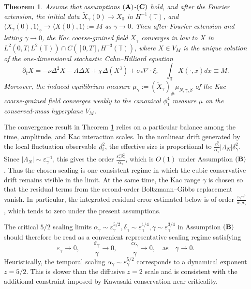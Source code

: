 \documentclass{article}
\newtheorem{theorem}{Theorem}
\begin{document}
\begin{theorem}\label{thm:main-informal}
Assume that assumptions \(({\bf A})\)-\(({\bf C})\) hold, and after the Fourier extension, the initial data $\widetilde X_\gamma(0)\longrightarrow X_0$ in $H^{-1}(\mathbb T)$, 
and
\(
    \langle X_\gamma(0),1\rangle_\gamma \to \langle X(0),1\rangle := M
\)
as $\gamma \to 0$.
Then after Fourier extension and letting \(\gamma\to0\), the Kac coarse-grained field $X_{\gamma}$ converges in law to $X$ in $L^2(0,T;L^2(\mathbb T))\cap C([0,T],H^{-3}(\mathbb T))$, where $X \in V_M$ is the unique solution of the one-dimensional stochastic Cahn–Hilliard equation
\begin{equation}\label{eq:modelB-intro}
    \partial_t X = -\nu \Delta^2 X - A \Delta X + \chi \Delta(X^3) + \sigma_* \nabla \cdot\xi, \quad \int_{\mathbb T} X(\cdot,x)dx \equiv M.
\end{equation}
Moreover, the induced equilibrium measure $\mu_\gamma := (\widetilde X_\gamma)_\#\mu_{N,\gamma,\beta}$ of the Kac coarse-grained field converges weakly to the canonical \(\phi^4_1\) measure \(\mu\) on the conserved-mass hyperplane \( V_M \).
\end{theorem}






The convergence result in Theorem \ref{thm:main-informal} relies on a particular balance among the time, amplitude, and Kac interaction scales.
In the nonlinear drift generated by the local fluctuation observable \(d_i^2\), the effective size is proportional to \(\frac{\varepsilon_\gamma^3}{\alpha_\gamma}|\Lambda_N|\delta_\gamma^2\). Since \(|\Lambda_N|\sim\varepsilon_\gamma^{-1}\), this gives the order \(\frac{\varepsilon_\gamma^2\delta_\gamma^2}{\alpha_\gamma}\), which is \(O(1)\) under Assumption \(({\bf B})\).
Thus the chosen scaling is one consistent regime in which the cubic conservative drift remains visible in the limit.
At the same time, the Kac range \(\gamma\) is chosen so that the residual terms from the second-order Boltzmann--Gibbs replacement vanish. In particular, the integrated residual error estimated below is of order
\(\frac{\varepsilon_\gamma\gamma^3}{\alpha_\gamma\delta_\gamma}\), which tends to zero under the present assumptions.


The critical \(5/2\) scaling limits \( \alpha_\gamma \sim \varepsilon_\gamma^{5/2}, \delta_\gamma \sim \varepsilon_\gamma^{1/4}, \gamma \sim \varepsilon_\gamma^{3/4}\) in Assumption \(({\bf B})\) should therefore be read as a convenient representative scaling regime satisfying
\[
\varepsilon_\gamma\to0,\qquad
\frac{\varepsilon_\gamma}{\gamma}\to0,\qquad
\frac{\alpha_\gamma}{\gamma}\to0, \quad \text{as} \quad \gamma\to 0.
\]
Heuristically, the temporal scaling \(\alpha_\gamma\sim\varepsilon_\gamma^{5/2}\) corresponds to a dynamical exponent \(z=5/2\). This is slower than the diffusive \(z=2\) scale and is consistent with the additional constraint imposed by Kawasaki conservation near criticality.
\end{document}
